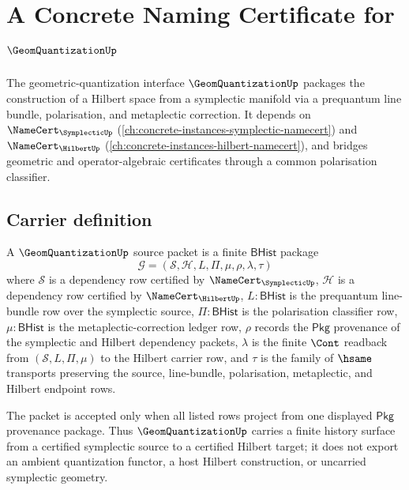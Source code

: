 \chapter{A Concrete Naming Certificate for $\GeomQuantizationUp$}
\label{ch:concrete-instances-geomquantization-namecert}

The geometric-quantization interface $\GeomQuantizationUp$ packages the construction of a Hilbert space from a symplectic manifold via a prequantum line bundle, polarisation, and metaplectic correction. It depends on $\NameCert_{\SymplecticUp}$ (\autoref{ch:concrete-instances-symplectic-namecert}) and $\NameCert_{\HilbertUp}$ (\autoref{ch:concrete-instances-hilbert-namecert}), and bridges geometric and operator-algebraic certificates through a common polarisation classifier.

\section{Carrier definition}
\label{sec:geomquantization-carrier}

\begin{definition}
\label{def:geomquantization-bhist-source-packet}
A $\GeomQuantizationUp$ source packet is a finite $\mathsf{BHist}$ package
$$
\mathcal{G}=(\mathcal{S},\mathcal{H},L,\Pi,\mu,\rho,\lambda,\tau)
$$
where $\mathcal{S}$ is a dependency row certified by $\NameCert_{\SymplecticUp}$, $\mathcal{H}$ is a dependency row certified by $\NameCert_{\HilbertUp}$, $L:\mathsf{BHist}$ is the prequantum line-bundle row over the symplectic source, $\Pi:\mathsf{BHist}$ is the polarisation classifier row, $\mu:\mathsf{BHist}$ is the metaplectic-correction ledger row, $\rho$ records the $\mathsf{Pkg}$ provenance of the symplectic and Hilbert dependency packets, $\lambda$ is the finite $\Cont$ readback from $(\mathcal{S},L,\Pi,\mu)$ to the Hilbert carrier row, and $\tau$ is the family of $\hsame$ transports preserving the source, line-bundle, polarisation, metaplectic, and Hilbert endpoint rows.

The packet is accepted only when all listed rows project from one displayed $\mathsf{Pkg}$ provenance package. Thus $\GeomQuantizationUp$ carries a finite history surface from a certified symplectic source to a certified Hilbert target; it does not export an ambient quantization functor, a host Hilbert construction, or uncarried symplectic geometry.
\end{definition}

